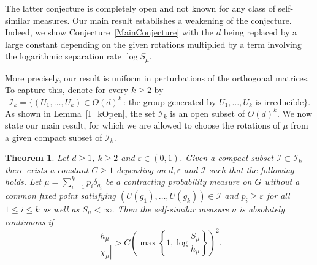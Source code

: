 \documentclass[10pt, english,oneside,reqno]{amsart}
\theoremstyle{plain}
\newtheorem{theorem}{Theorem}[section]
\theoremstyle{remark}
\numberwithin{equation}{section}
\numberwithin{figure}{section}
\newcommand{\eps}{\varepsilon}
\begin{document}
    The latter conjecture is completely open and not known for any class of self-similar measures. Our main result establishes a weakening of the conjecture. Indeed, we show Conjecture~\ref{MainConjecture} with the $d$ being replaced by a large constant depending on the given rotations multiplied by a term involving the logarithmic separation rate $\log S_{\mu}$.
    

    More precisely, our result is uniform in perturbations of the orthogonal matrices. To capture this, denote for every $k \geq 2$ by $$\mathcal{I}_{k} = \{ (U_1, \ldots , U_{k}) \in O(d)^{k} \,:\, \text{the group generated by } U_1,\ldots, U_{k} \text{ is irreducible}  \}.$$ As shown in Lemma~\ref{I_kOpen}, the set $\mathcal{I}_k$ is an open subset of $O(d)^{k}$. We now state our main result, for which we are allowed to choose the rotations of $\mu$ from a given compact subset of $\mathcal{I}_k$.

    \begin{theorem}\label{MainResultFixU}
        Let $d \geq 1$, $k \geq 2$ and $\eps \in (0,1)$. Given a compact subset $\mathcal{I} \subset \mathcal{I}_{k}$ there exists a constant $C\geq 1$ depending on $d,\eps$ and $\mathcal{I}$ such that the following holds. Let $\mu = \sum_{i = 1}^k p_i\delta_{g_i}$ be a contracting probability measure on $G$ without a common fixed point satisfying $(U(g_1), \ldots, U(g_k)) \in \mathcal{I}$ and $p_i \geq \eps$ for all $1 \leq i \leq k$ as well as $S_{\mu}<\infty$. Then the self-similar measure $\nu$ is absolutely continuous if 
        \begin{equation}\label{MainCondition}
            \frac{h_{\mu}}{|\chi_{\mu}|} > C \left( \max\left\{ 1, \log \frac{S_{\mu}}{h_{\mu}} \right\} \right)^2.
        \end{equation}
    \end{theorem}

    
\end{document}
